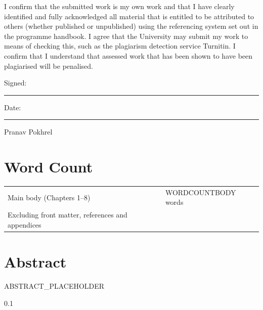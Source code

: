 \documentclass[11pt,a4paper,oneside]{report}
\begin{document}
I confirm that the submitted work is my own work and that I have clearly
identified and fully acknowledged all material that is entitled to be
attributed to others (whether published or unpublished) using the referencing
system set out in the programme handbook. I agree that the University may
submit my work to means of checking this, such as the plagiarism detection
service Turnitin\textregistered{}. I confirm that I understand that assessed
work that has been shown to have been plagiarised will be penalised.

\vspace{3\baselineskip}
\noindent Signed: \rule{6cm}{0.4pt}\hfill Date: \rule{4cm}{0.4pt}

\vspace{\baselineskip}
\noindent Pranav Pokhrel

\clearpage
\newpage
\chapter*{Word Count}

\begin{tabular}{ll}
\toprule
Main body (Chapters 1--8) & WORDCOUNTBODY words \\
Excluding front matter, references and appendices & \\
\bottomrule
\end{tabular}

\clearpage
{}
\chapter*{Abstract}
ABSTRACT_PLACEHOLDER

\begin{spacing}{0.1}
	\tableofcontents
\end{spacing}
\end{document}
